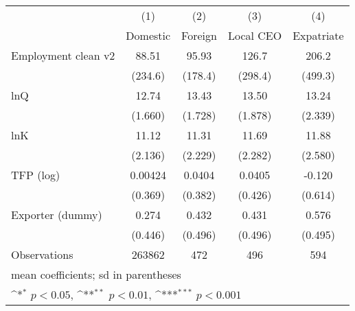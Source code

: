 {
\def\sym#1{\ifmmode^{#1}\else\(^{#1}\)\fi}
\begin{tabular}{l*{4}{c}}
\hline\hline
                    &\multicolumn{1}{c}{(1)}&\multicolumn{1}{c}{(2)}&\multicolumn{1}{c}{(3)}&\multicolumn{1}{c}{(4)}\\
                    &\multicolumn{1}{c}{Domestic}&\multicolumn{1}{c}{Foreign}&\multicolumn{1}{c}{Local CEO}&\multicolumn{1}{c}{Expatriate}\\
\hline
Employment clean v2 &       88.51         &       95.93         &       126.7         &       206.2         \\
                    &     (234.6)         &     (178.4)         &     (298.4)         &     (499.3)         \\
[1em]
lnQ                 &       12.74         &       13.43         &       13.50         &       13.24         \\
                    &     (1.660)         &     (1.728)         &     (1.878)         &     (2.339)         \\
[1em]
lnK                 &       11.12         &       11.31         &       11.69         &       11.88         \\
                    &     (2.136)         &     (2.229)         &     (2.282)         &     (2.580)         \\
[1em]
TFP (log)           &     0.00424         &      0.0404         &      0.0405         &      -0.120         \\
                    &     (0.369)         &     (0.382)         &     (0.426)         &     (0.614)         \\
[1em]
Exporter (dummy)    &       0.274         &       0.432         &       0.431         &       0.576         \\
                    &     (0.446)         &     (0.496)         &     (0.496)         &     (0.495)         \\
\hline
Observations        &      263862         &         472         &         496         &         594         \\
\hline\hline
\multicolumn{5}{l}{\footnotesize mean coefficients; sd in parentheses}\\
\multicolumn{5}{l}{\footnotesize \sym{*} \(p<0.05\), \sym{**} \(p<0.01\), \sym{***} \(p<0.001\)}\\
\end{tabular}
}
